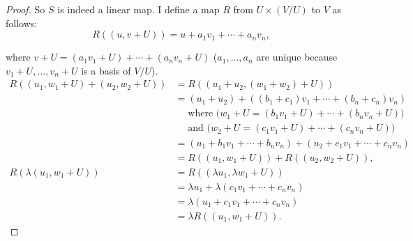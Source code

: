 \begin{proof}
    So $S$ is indeed a linear map. I define a map $R$ from $U\times (V/U)$ to $V$ as follows:
    \[
        R((u, v + U)) = u + a_{1}v_{1} + \cdots + a_{n}v_{n},
    \]

    where $v + U = (a_{1}v_{1} + U) + \cdots + (a_{n}v_{n} + U)$ ($a_{1}, \ldots, a_{n}$ are unique because $v_{1} + U, \ldots, v_{n} + U$ is a basis of $V/U$).
    \begin{align*}
        R((u_{1}, w_{1} + U) + (u_{2}, w_{2} + U)) & = R((u_{1} + u_{2}, (w_{1} + w_{2}) + U))                                                 \\
                                                   & = (u_{1} + u_{2}) + ((b_{1} + c_{1})v_{1} + \cdots + (b_{n} + c_{n})v_{n})                \\
                                                   & \phantom{=}\text{where ($w_{1} + U = (b_{1}v_{1} + U) + \cdots + (b_{n}v_{n} + U))$}      \\
                                                   & \phantom{=}\text{and ($w_{2} + U = (c_{1}v_{1} + U) + \cdots + (c_{n}v_{n} + U)$)}        \\
                                                   & = (u_{1} + b_{1}v_{1} + \cdots + b_{n}v_{n}) + (u_{2} + c_{1}v_{1} + \cdots + c_{n}v_{n}) \\
                                                   & = R((u_{1}, w_{1} + U)) + R((u_{2}, w_{2} + U)),                                          \\
        R(\lambda (u_{1}, w_{1} + U))              & = R((\lambda u_{1}, \lambda w_{1} + U))                                                   \\
                                                   & = \lambda u_{1} + \lambda (c_{1}v_{1} + \cdots + c_{n}v_{n})                              \\
                                                   & = \lambda (u_{1} + c_{1}v_{1} + \cdots + c_{n}v_{n})                                      \\
                                                   & = \lambda R((u_{1}, w_{1} + U)).
    \end{align*}


\end{proof}
